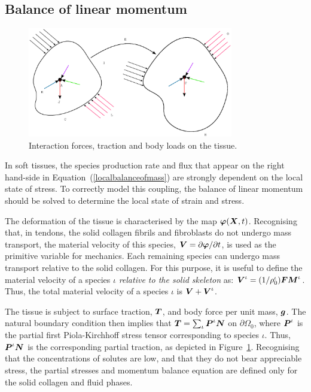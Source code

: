 \subsection{Balance of linear momentum}
\label{balance-of-linear-momentum}

\begin{figure}[ht]
  \centering
  \includegraphics[width=0.8\textwidth]{images/elucidation/cp-momentum}
  \caption{Interaction forces, traction and body loads on the tissue.}
  \label{continuum-potato-momentum}
\end{figure}

In soft tissues, the species production rate and flux that appear on
the right hand-side in Equation~(\ref{localbalanceofmass}) are
strongly dependent on the local state of stress. To correctly model this
coupling, the balance of linear momentum should be solved to determine
the local state of strain and stress.

The deformation of the tissue is characterised by the map
$\mbox{\boldmath$\varphi$}(\mbox{\boldmath$ X$},t)$. Recognising that, in tendons, the solid collagen
fibrils and fibroblasts do not undergo mass transport, the material
velocity of this species, $\mbox{\boldmath$ V$} = \partial\mbox{\boldmath$\varphi$}/\partial t$, is used
as the primitive variable for mechanics. Each remaining species can
undergo mass transport relative to the solid collagen. For this
purpose, it is useful to define the material velocity of a species
$\iota$ \emph{relative to the solid skeleton} as: $\mbox{\boldmath$ V$}^\iota =
(1/\rho_0^\iota)\mbox{\boldmath$ F$}\mbox{\boldmath$ M$}^\iota$. Thus, the total material velocity of a
species $\iota$ is $\mbox{\boldmath$ V$}+\mbox{\boldmath$ V$}^\iota$.

The tissue is subject to surface traction, $\mbox{\boldmath$ T$}$, and body force per
unit mass, $\mbox{\boldmath$ g$}$. The natural boundary condition then implies that
$\mbox{\boldmath$ T$} = \sum_{\iota}\mbox{\boldmath$ P$}^\iota\mbox{\boldmath$ N$}$ on $\partial\Omega_0$, where
$\mbox{\boldmath$ P$}^\iota$ is the partial first Piola-Kirchhoff stress tensor
corresponding to species $\iota$. Thus, $\mbox{\boldmath$ P$}^\iota\mbox{\boldmath$ N$}$ is the
corresponding partial traction, as depicted in
Figure~\ref{continuum-potato-momentum}. Recognising that the
concentrations of solutes are low, and that they do not bear
appreciable stress, the partial stresses and momentum balance equation
are defined only for the solid collagen and fluid phases.

